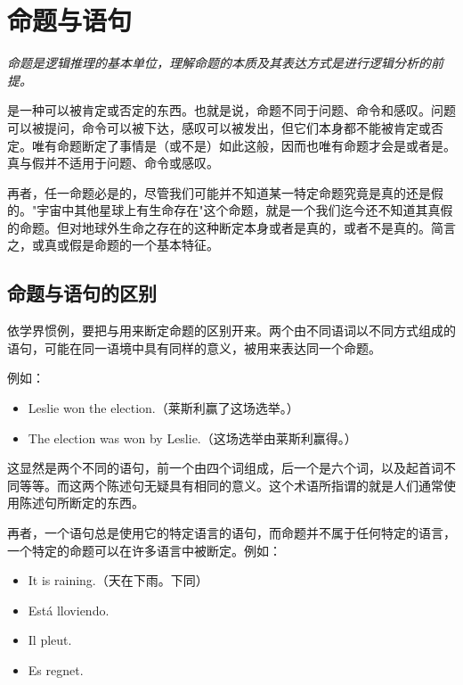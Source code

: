 \section{命题与语句}

\begin{logicbox}[title=引言]
\textit{命题是逻辑推理的基本单位，理解命题的本质及其表达方式是进行逻辑分析的前提。}
\end{logicbox}

是一种可以被肯定或否定的东西。也就是说，命题不同于问题、命令和感叹。问题可以被提问，命令可以被下达，感叹可以被发出，但它们本身都不能被肯定或否定。唯有命题断定了事情是（或不是）如此这般，因而也唯有命题才会是或者是。真与假并不适用于问题、命令或感叹。

再者，任一命题必是的，尽管我们可能并不知道某一特定命题究竟是真的还是假的。"宇宙中其他星球上有生命存在"这个命题，就是一个我们迄今还不知道其真假的命题。但对地球外生命之存在的这种断定本身或者是真的，或者不是真的。简言之，或真或假是命题的一个基本特征。

\subsection{命题与语句的区别}

\begin{theorembox}[title=重要区分]
依学界惯例，要把与用来断定命题的区别开来。两个由不同语词以不同方式组成的语句，可能在同一语境中具有同样的意义，被用来表达同一个命题。
\end{theorembox}

例如：

\begin{itemize}
  \item Leslie won the election.（莱斯利赢了这场选举。）
  \item The election was won by Leslie.（这场选举由莱斯利赢得。）
\end{itemize}

这显然是两个不同的语句，前一个由四个词组成，后一个是六个词，以及起首词不同等等。而这两个陈述句无疑具有相同的意义。这个术语所指谓的就是人们通常使用陈述句所断定的东西。

再者，一个语句总是使用它的特定语言的语句，而命题并不属于任何特定的语言，一个特定的命题可以在许多语言中被断定。例如：

\begin{itemize}
  \item It is raining.（天在下雨。下同）
  \item Está lloviendo.
  \item Il pleut.
  \item Es regnet.
\end{itemize}


